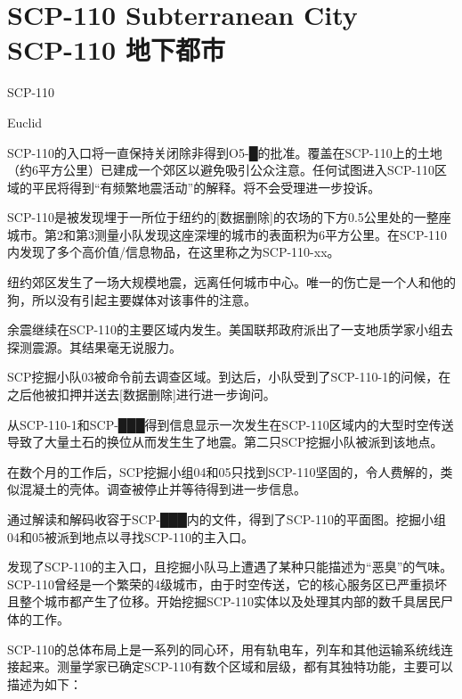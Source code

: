 \chapter[SCP-110 地下都市]{
    SCP-110 Subterranean City\\
    SCP-110 地下都市
}

\label{chap:SCP-110}

SCP-110

Euclid

SCP-110的入口将一直保持关闭除非得到O5-█的批准。覆盖在SCP-110上的土地（约6平方公里）已建成一个郊区以避免吸引公众注意。任何试图进入SCP-110区域的平民将得到“有频繁地震活动”的解释。将不会受理进一步投诉。

SCP-110是被发现埋于一所位于纽约的{[}数据删除]的农场的下方0.5公里处的一整座城市。第2和第3测量小队发现这座深埋的城市的表面积为6平方公里。在SCP-110内发现了多个高价值\slash 信息物品，在这里称之为SCP-110-xx。


纽约郊区发生了一场大规模地震，远离任何城市中心。唯一的伤亡是一个人和他的狗，所以没有引起主要媒体对该事件的注意。

余震继续在SCP-110的主要区域内发生。美国联邦政府派出了一支地质学家小组去探测震源。其结果毫无说服力。

SCP挖掘小队03被命令前去调查区域。到达后，小队受到了SCP-110-1的问候，在之后他被扣押并送去{[}数据删除]进行进一步询问。

从SCP-110-1和SCP-███得到信息显示一次发生在SCP-110区域内的大型时空传送导致了大量土石的换位从而发生生了地震。第二只SCP挖掘小队被派到该地点。

在数个月的工作后，SCP挖掘小组04和05只找到SCP-110坚固的，令人费解的，类似混凝土的壳体。调查被停止并等待得到进一步信息。

通过解读和解码收容于SCP-███内的文件，得到了SCP-110的平面图。挖掘小组04和05被派到地点以寻找SCP-110的主入口。

发现了SCP-110的主入口，且挖掘小队马上遭遇了某种只能描述为“恶臭”的气味。SCP-110曾经是一个繁荣的4级城市，由于时空传送，它的核心服务区已严重损坏且整个城市都产生了位移。开始挖掘SCP-110实体以及处理其内部的数千具居民尸体的工作。


SCP-110的总体布局上是一系列的同心环，用有轨电车，列车和其他运输系统线连接起来。测量学家已确定SCP-110有数个区域和层级，都有其独特功能，主要可以描述为如下：

